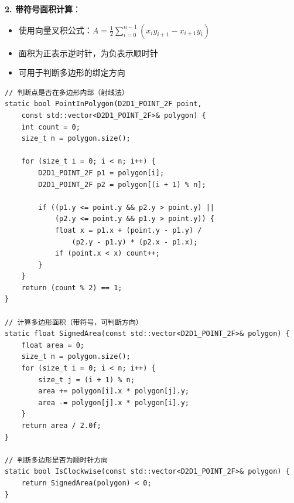 \documentclass[12pt,a4paper]{article}
\begin{document}
\begin{tcolorbox}
\textbf{2. 带符号面积计算}：
\begin{itemize}
    \item 使用向量叉积公式：$A = \frac{1}{2}\sum_{i=0}^{n-1}(x_i y_{i+1} - x_{i+1} y_i)$
    \item 面积为正表示逆时针，为负表示顺时针
    \item 可用于判断多边形的绑定方向
\end{itemize}

\begin{lstlisting}[caption={多边形工具函数}]
// 判断点是否在多边形内部（射线法）
static bool PointInPolygon(D2D1_POINT_2F point, 
    const std::vector<D2D1_POINT_2F>& polygon) {
    int count = 0;
    size_t n = polygon.size();
    
    for (size_t i = 0; i < n; i++) {
        D2D1_POINT_2F p1 = polygon[i];
        D2D1_POINT_2F p2 = polygon[(i + 1) % n];
        
        if ((p1.y <= point.y && p2.y > point.y) || 
            (p2.y <= point.y && p1.y > point.y)) {
            float x = p1.x + (point.y - p1.y) / 
                (p2.y - p1.y) * (p2.x - p1.x);
            if (point.x < x) count++;
        }
    }
    return (count % 2) == 1;
}

// 计算多边形面积（带符号，可判断方向）
static float SignedArea(const std::vector<D2D1_POINT_2F>& polygon) {
    float area = 0;
    size_t n = polygon.size();
    for (size_t i = 0; i < n; i++) {
        size_t j = (i + 1) % n;
        area += polygon[i].x * polygon[j].y;
        area -= polygon[j].x * polygon[i].y;
    }
    return area / 2.0f;
}

// 判断多边形是否为顺时针方向
static bool IsClockwise(const std::vector<D2D1_POINT_2F>& polygon) {
    return SignedArea(polygon) < 0;
}
\end{lstlisting}

\end{tcolorbox}
\end{document}
